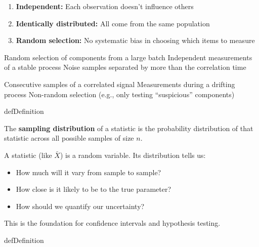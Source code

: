 
\begin{enumerate}
\def\labelenumi{\arabic{enumi}.}
\tightlist
\item
  \textbf{Independent:} Each observation doesn’t influence others
\item
  \textbf{Identically distributed:} All come from the same population
\item
  \textbf{Random selection:} No systematic bias in choosing which items to measure
\end{enumerate}


\PSyes{} Random selection of components from a large batch\PSbr{}\PSyes{} Independent measurements of a stable process\PSbr{}\PSyes{} Noise samples separated by more than the correlation time


\PSno{} Consecutive samples of a correlated signal\PSbr{}\PSno{} Measurements during a drifting process\PSbr{}\PSno{} Non-random selection (e.g., only testing ``suspicious'' components)


\begin{PSbox}[unbreakable]{def}{Definition}

The \textbf{sampling distribution} of a statistic is the probability distribution of that statistic across all possible samples of size $n$.

\end{PSbox}


A statistic (like $\bar{X}$) is a random variable. Its distribution tells us:

\begin{itemize}
\tightlist
\item
  How much will it vary from sample to sample?
\item
  How close is it likely to be to the true parameter?
\item
  How should we quantify our uncertainty?
\end{itemize}

This is the foundation for confidence intervals and hypothesis testing.


\begin{PSbox}[unbreakable]{def}{Definition}


\end{PSbox}

